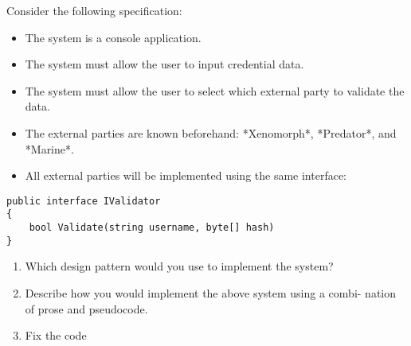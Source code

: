 
Consider the following specification:
\begin{itemize}
	\item The system is a console application.
	\item The system must allow the user to input credential data.
	\item The system must allow the user to select which external party to validate the data.
	\item The external parties are known beforehand: *Xenomorph*, *Predator*, and *Marine*.
	\item All external parties will be implemented using the same interface:
\end{itemize}

\begin{lstlisting}
public interface IValidator
{
	bool Validate(string username, byte[] hash)
}
\end{lstlisting}

\pgfmathsetmacro{}

\begin{enumerate}[a]
    \item {} Which design pattern would you use to implement the system? 
		\newline\answer\questionThreeAnswerA

	\item {} Describe how you would implement the above system using a combi-
nation of prose and pseudocode. 
		\newline\answer\questionThreeAnswerB
		

	\item {} Fix the code
\end{enumerate}
